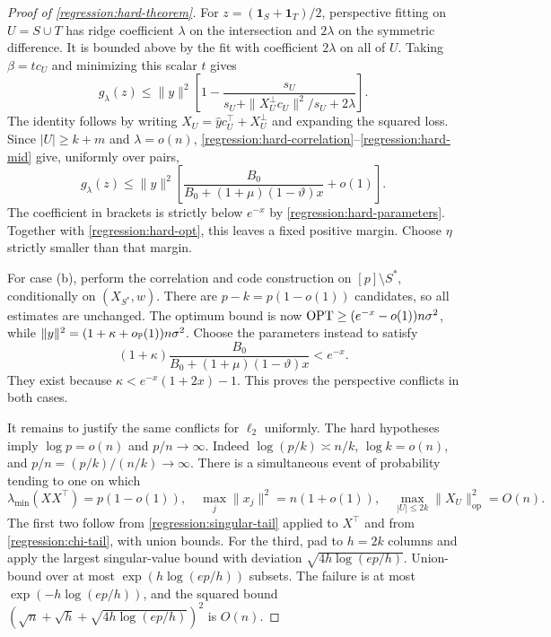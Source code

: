 \begin{proof}[Proof of \cref{regression:hard-theorem}]
For $z=(\mathbf1_S+\mathbf1_T)/2$, perspective fitting on
$U=S\cup T$ has ridge coefficient $\lambda$ on the intersection
and $2\lambda$ on the symmetric difference. It is bounded above
by the fit with coefficient $2\lambda$ on all of $U$.
Taking $\beta=t c_U$ and minimizing this scalar $t$ gives
\begin{equation}\label{regression:hard-mid}
 g_\lambda(z)\leq
 \|y\|^2\left[1-\frac{s_U}
 {s_U+\|X_U^\perp c_U\|^2/s_U+2\lambda}\right].
\end{equation}
The identity follows by writing
$X_U=\widehat y c_U^\top+X_U^\perp$ and expanding the squared loss.
Since $|U|\geq k+m$ and $\lambda=o(n)$,
\eqref{regression:hard-correlation}--\eqref{regression:hard-mid}
give, uniformly over pairs,
\[
 g_\lambda(z)\leq\|y\|^2
 \left[\frac{B_0}{B_0+(1+\mu)(1-\vartheta)x}+o(1)\right].
\]
The coefficient in brackets is strictly below $e^{-x}$ by
\eqref{regression:hard-parameters}. Together with
\eqref{regression:hard-opt}, this leaves a fixed positive
margin. Choose $\eta$ strictly smaller than that margin.

For case (b), perform the correlation and code construction on
$[p]\setminus S^*$, conditionally on $(X_{S^*},w)$.
There are $p-k=p(1-o(1))$ candidates, so all estimates are unchanged.
The optimum bound is now
$\operatorname{OPT}\geq(e^{-x}-o(1))n\sigma^2$, while
$\|y\|^2=(1+\kappa+o_{\mathbb{P}}(1))n\sigma^2$.
Choose the parameters instead to satisfy
\[
 (1+\kappa)\frac{B_0}{B_0+(1+\mu)(1-\vartheta)x}<e^{-x}.
\]
They exist because $\kappa<e^{-x}(1+2x)-1$.
This proves the perspective conflicts in both cases.

It remains to justify the same conflicts for $\ell_2$ uniformly.
The hard hypotheses imply $\log p=o(n)$ and $p/n\to\infty$.
Indeed $\log(p/k)\asymp n/k$, $\log k=o(n)$, and
$p/n=(p/k)/(n/k)\to\infty$.
There is a simultaneous event of probability tending to one on which
\begin{equation}\label{regression:uniform-hard-design}
 \lambda_{\min}(XX^\top)=p(1-o(1)),\quad
 \max_j\|x_j\|^2=n(1+o(1)),\quad
 \max_{|U|\leq2k}\|X_U\|_{\mathrm{op}}^2=O(n).
\end{equation}
The first two follow from
\eqref{regression:singular-tail} applied to $X^\top$ and from
\eqref{regression:chi-tail}, with union bounds.
For the third, pad to $h=2k$ columns and apply the largest
singular-value bound with deviation
$\sqrt{4h\log(ep/h)}$. Union-bound over at most
$\exp(h\log(ep/h))$ subsets. The failure is at most
$\exp(-h\log(ep/h))$, and the squared bound
$(\sqrt n+\sqrt h+\sqrt{4h\log(ep/h)})^2$ is $O(n)$.


\end{proof}
